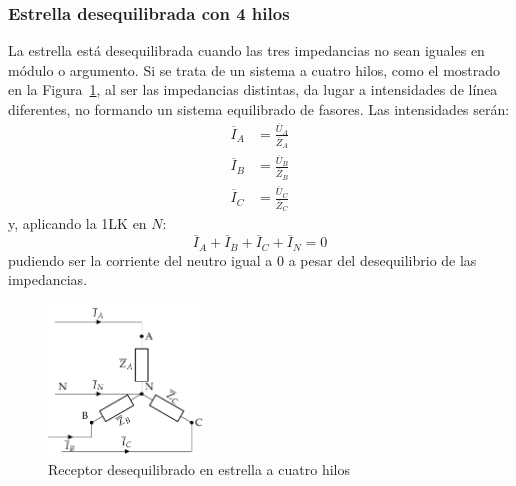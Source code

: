 	\subsubsection{Estrella desequilibrada con 4 hilos}
	\label{ref:estrella-des-4h}
	La estrella está desequilibrada cuando las tres impedancias no
        sean iguales en módulo o argumento. Si se trata de un sistema
        a cuatro hilos, como el mostrado en la
        Figura~\ref{fig:estrelladeseqiulibrado_4hilos}, al ser las
        impedancias distintas, da lugar a intensidades de línea
        diferentes, no formando un sistema equilibrado de fasores. Las
        intensidades serán:
	\begin{align*}
          \overline{I}_A &= \frac{\overline{U}_A}{\overline{Z}_A}\\
          \overline{I}_B &= \frac{\overline{U}_B}{\overline{Z}_B}\\
          \overline{I}_C &= \frac{\overline{U}_C}{\overline{Z}_C}
        \end{align*}
        y, aplicando la 1LK en $N$:
        \begin{equation}
          \overline{I}_A  + \overline{I}_B + \overline{I}_C + \overline{I}_N = 0
        \end{equation}
	pudiendo ser la corriente del neutro igual a 0 a pesar del
        desequilibrio de las impedancias.
	
	\begin{figure}[H]
          \centering
          \includegraphics[height=4cm]{../figs/EstrellaDesequilibrado_Receptor.pdf}
          \caption{Receptor desequilibrado en estrella a cuatro hilos}
          \label{fig:estrelladeseqiulibrado_4hilos}
	\end{figure}
	
